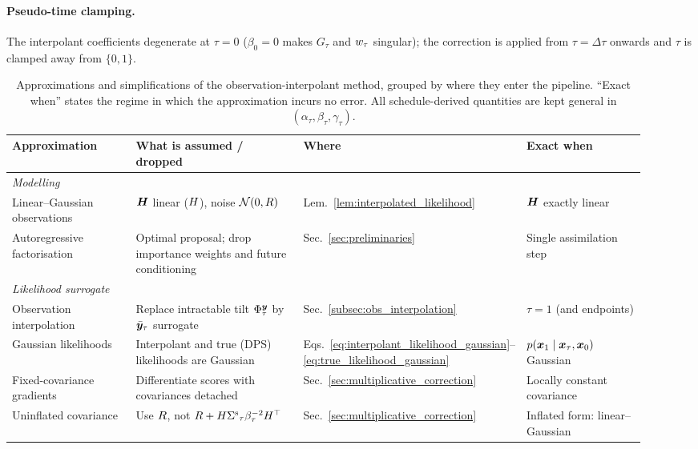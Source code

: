 \paragraph{Pseudo-time clamping.}
The interpolant coefficients degenerate at $\tau=0$ ($\beta_0=0$ makes $G_\tau$ and
$w_\tau$ singular); the correction is applied from $\tau=\Delta\tau$
onwards and $\tau$ is clamped away from $\{0,1\}$.

\begin{table}[ht]
    \centering
    \caption{Approximations and simplifications of the observation-interpolant
    method, grouped by where they enter the pipeline. ``Exact when'' states the
    regime in which the approximation incurs no error. All schedule-derived
    quantities are kept general in $(\alpha_\tau,\beta_\tau,\gamma_\tau)$.}
    \label{tab:approximations}
    \small
    \begin{tabular}{p{0.21\linewidth} p{0.30\linewidth} p{0.20\linewidth} p{0.21\linewidth}}
        \toprule
        \textbf{Approximation} & \textbf{What is assumed / dropped} & \textbf{Where} & \textbf{Exact when} \\
        \midrule
        \multicolumn{4}{l}{\emph{Modelling}}\\
        Linear--Gaussian observations & $\boldsymbol{H}$ linear ($H$), noise $\mathcal N(0,R)$ & Lem.~\ref{lem:interpolated_likelihood} & $\boldsymbol{H}$ exactly linear \\
        Autoregressive factorisation & Optimal proposal; drop importance weights and future conditioning & Sec.~\ref{sec:preliminaries} & Single assimilation step \\
        \midrule
        \multicolumn{4}{l}{\emph{Likelihood surrogate}}\\
        Observation interpolation & Replace intractable tilt $\Phi_\tau^{\boldsymbol{y}}$ by $\bar{\boldsymbol{y}}_\tau$ surrogate & Sec.~\ref{subsec:obs_interpolation} & $\tau=1$ (and endpoints) \\
        Gaussian likelihoods & Interpolant and true (DPS) likelihoods are Gaussian & Eqs.~\eqref{eq:interpolant_likelihood_gaussian}--\eqref{eq:true_likelihood_gaussian} & $p(\boldsymbol{x}_1\mid\boldsymbol{x}_\tau,\boldsymbol{x}_0)$ Gaussian \\
        Fixed-covariance gradients & Differentiate scores with covariances detached & Sec.~\ref{sec:multiplicative_correction} & Locally constant covariance \\
        Uninflated covariance & Use $R$, not $R+H{\Sigma^{\mathrm{s}}}_\tau\beta_\tau^{-2}H^\top$ & Sec.~\ref{sec:multiplicative_correction} & Inflated form: linear--Gaussian \\

\end{tabular}
\end{table}
